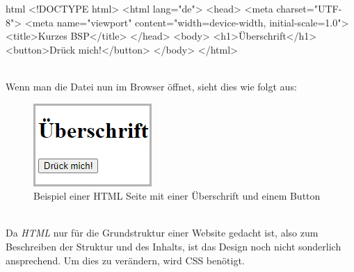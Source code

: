 		\begin{code}{html}
			<!DOCTYPE html>
			<html lang="de">
				<head>
					<meta charset="UTF-8">
					<meta name="viewport" content="width=device-width, initial-scale=1.0">
					<title>Kurzes BSP</title>
				</head>
				<body>
					<h1>Überschrift</h1>
					<button>Drück mich!</button>
				</body>
			</html>
		\end{code}
	\label{list:htmlbsp} ~\\
		Wenn man die Datei nun im Browser öffnet, sieht dies wie folgt aus:
		\begin{figure}[H]
			\centering
			\includegraphics[width=0.2\linewidth]{images/ldehner_study/html1}
			\caption[HTML Beispielseite]{Beispiel einer HTML Seite mit einer Überschrift und einem Button}
			\label{fig:htmlbsp}
		\end{figure}
		~\\
		Da \textit{HTML} nur für die Grundstruktur einer Website gedacht ist, also zum Beschreiben der Struktur und des Inhalts, ist das Design noch nicht sonderlich ansprechend. Um dies zu verändern, wird CSS benötigt.
		
